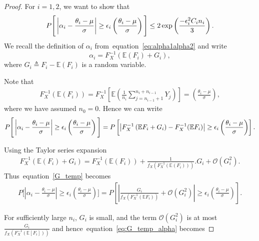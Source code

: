 \documentclass[10pt]{article} %
\def\eqref#1{equation~\ref{#1}}
\theoremstyle{plain}
\theoremstyle{definition}
\theoremstyle{remark}
\newcommand{\bE}{\mathbb E}
\newcommand{\cO}{\mathcal O}
\begin{document}
\begin{proof}
For  $i =1,2$, we want to show  that
\begin{align}
P \Bigg [ \left| \alpha_i -  \frac{\theta_i - \mu}{\sigma} \right| \geq  \epsilon_i\left(  \frac{\theta_i - \mu }{\sigma}\right)  \Bigg] \leq 2 \exp \left( \frac{- \epsilon_i ^2 C_i n_i}{3} \right). \notag
\end{align}
We recall the definition of \( \alpha_i\) from~\eqref{eq:alpha1alpha2} and write
\begin{equation*}
 \alpha_i = F_{X}^{-1}(\bE(F_i) + G_i ),
\end{equation*} 
where \( G_i \triangleq  F_i - \bE (F_i)  \)  is a random variable.
\par Note that
 \begin{align*}
F_{X}^{-1}(\bE(F_i)) =  F_{X}^{-1}\left[ \bE \left( \frac{1}{n_i}\sum_{j=n_{i-1}+1}^{n_i+n_{i-1}} Y_{j}\right) \right]  = \left( \frac{\theta_i - \mu}{\sigma} \right),
\end{align*}
where we have assumed $n_0=0$. Hence we can write
\begin{equation}
    \begin{aligned}
     P \Bigg [ \left| \alpha_i -  \frac{\theta_i - \mu}{\sigma} \right| \geq  \epsilon_i\left(  \frac{\theta_i - \mu }{\sigma}\right)  \Bigg ] = P \left [ \left| F_{X}^{-1} \left(\bE F_i +  G_i \right)   -  F_{X}^{-1}(\bE F_i)  \right| \geq  \epsilon_i\left(  \frac{\theta_i - \mu }{\sigma}\right)  \right] . \notag
    \end{aligned}
    \label{G_temp}
\end{equation}

Using the Taylor series expansion
\begin{align}
F_{X}^{-1}(\bE(F_i) + G_i ) = F_{X}^{-1}(\bE(F_i)) +  \frac{1}{f_{X}(F_{X}^{-1}(\bE(F_i)))}. G_i + \cO(G_i^2).  \label{delta_term}
\end{align}
Thus~\eqref{G_temp} becomes
\begin{align}
P \Bigg [ \left| \alpha_i -  \frac{\theta_i - \mu}{\sigma} \right| \geq  \epsilon_i\left(  \frac{\theta_i - \mu }{\sigma}\right)  \Bigg ] =   P \left [ \left| \frac{G_i}{f_X(F_X^{-1}(\bE F_i))}  + \cO (G_{i}^{2})  \right| \geq  \epsilon_i \left(  \frac{\theta_i - \mu }{\sigma}\right)  \right].\label{eq:G_temp_alpha}
\end{align}


For sufficiently large \(n_i\), \(G_i\) is small, and the term \(\mathcal{O}(G_i^2)\) is at most \(\frac{G_i}{f_X(F_X^{-1}(\bE[F_i]))}\) and hence~\eqref{eq:G_temp_alpha} becomes 




\end{proof}
\end{document}
